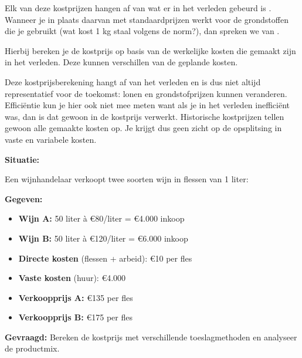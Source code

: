 \documentclass[a4paper,11pt]{article}
\begin{document}
Elk van deze kostprijzen hangen af van wat er in het verleden
gebeurd is .
Wanneer je in plaats daarvan met standaardprijzen werkt
voor de grondstoffen die je gebruikt (wat kost 1 kg staal volgens de norm?),
dan spreken we van .


\begin{description}
    \item{} Hierbij bereken je de kostprijs op basis van de
          werkelijke kosten die gemaakt zijn in het verleden.
          Deze kunnen verschillen van de geplande kosten.
          \newline

          Deze kostprijsberekening hangt af van het verleden
          en is dus niet altijd representatief voor de toekomst:
          lonen en grondstofprijzen kunnen veranderen.
          Efficiëntie kun je hier ook niet mee meten want als je in het verleden
          inefficiënt was, dan is dat gewoon in de kostprijs verwerkt.
          \newline
          Historische kostprijzen tellen gewoon alle gemaakte kosten op.
          Je krijgt dus geen zicht op de opsplitsing in vaste en variabele kosten.

          \begin{oefenblok}
              \textbf{Situatie:}

              Een wijnhandelaar verkoopt twee soorten wijn in flessen van 1 liter:

              \textbf{Gegeven:}
              \begin{itemize}
                  \item \textbf{Wijn A:} 50 liter à €80/liter = €4.000 inkoop
                  \item \textbf{Wijn B:} 50 liter à €120/liter = €6.000 inkoop
                  \item \textbf{Directe kosten} (flessen + arbeid): €10 per fles
                  \item \textbf{Vaste kosten} (huur): €4.000
                  \item \textbf{Verkoopprijs A:} €135 per fles
                  \item \textbf{Verkoopprijs B:} €175 per fles
              \end{itemize}

              \textbf{Gevraagd:} Bereken de kostprijs met verschillende toeslagmethoden en analyseer de productmix.


\end{oefenblok}
\end{description}
\end{document}
